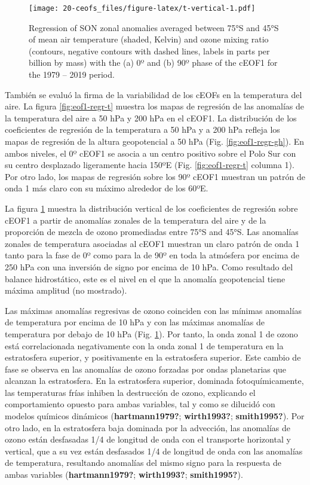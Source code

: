\documentclass[12pt,oneside]{reedthesis}
\begin{document}
\begin{figure}
\centering
\texttt{[image: 20-ceofs\_files/figure-latex/t-vertical-1.pdf]}
\caption{\label{fig:t-vertical}Regression of SON zonal anomalies averaged between 75°S and 45°S of mean air temperature (shaded, Kelvin) and ozone mixing ratio (contours, negative contours with dashed lines, labels in parts per billion by mass) with the (a) 0º and (b) 90º phase of the cEOF1 for the 1979 -- 2019 period.}
\end{figure}
También se evaluó la firma de la variabilidad de los cEOFs en la temperatura del aire.
La figura \ref{fig:eof1-regr-t} muestra los mapas de regresión de las anomalías de la temperatura del aire a 50 hPa y 200 hPa en el cEOF1.
La distribución de los coeficientes de regresión de la temperatura a 50 hPa y a 200 hPa refleja los mapas de regresión de la altura geopotencial a 50 hPa (Fig. \ref{fig:eof1-regr-gh}).
En ambos niveles, el 0º cEOF1 se asocia a un centro positivo sobre el Polo Sur con su centro desplazado ligeramente hacia 150ºE (Fig. \ref{fig:eof1-regr-t} columna 1).
Por otro lado, los mapas de regresión sobre los 90º cEOF1 muestran un patrón de onda 1 más claro con su máximo alrededor de los 60ºE.

La figura \ref{fig:t-vertical} muestra la distribución vertical de los coeficientes de regresión sobre cEOF1 a partir de anomalías zonales de la temperatura del aire y de la proporción de mezcla de ozono promediadas entre 75°S and 45°S.
Las anomalías zonales de temperatura asociadas al cEOF1 muestran un claro patrón de onda 1 tanto para la fase de 0º como para la de 90º en toda la atmósfera por encima de 250 hPa con una inversión de signo por encima de 10 hPa.
Como resultado del balance hidrostático, este es el nivel en el que la anomalía geopotencial tiene máxima amplitud (no mostrado).

Las máximas anomalías regresivas de ozono coinciden con las mínimas anomalías de temperatura por encima de 10 hPa y con las máximas anomalías de temperatura por debajo de 10 hPa (Fig. \ref{fig:t-vertical}).
Por tanto, la onda zonal 1 de ozono está correlacionada negativamente con la onda zonal 1 de temperatura en la estratosfera superior, y positivamente en la estratosfera superior.
Este cambio de fase se observa en las anomalías de ozono forzadas por ondas planetarias que alcanzan la estratosfera.
En la estratosfera superior, dominada fotoquímicamente, las temperaturas frías inhiben la destrucción de ozono, explicando el comportamiento opuesto para ambas variables, tal y como se dilucidó con modelos químicos dinámicos (\textbf{hartmann1979?}; \textbf{wirth1993?}; \textbf{smith1995?}).
Por otro lado, en la estratosfera baja dominada por la advección, las anomalías de ozono están desfasadas 1/4 de longitud de onda con el transporte horizontal y vertical, que a su vez están desfasados 1/4 de longitud de onda con las anomalías de temperatura, resultando anomalías del mismo signo para la respuesta de ambas variables (\textbf{hartmann1979?}; \textbf{wirth1993?}; \textbf{smith1995?}).
\end{document}
